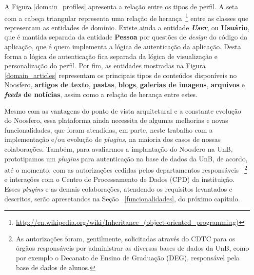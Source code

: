 A Figura \ref{domain_profiles} apresenta a relação entre os tipos de perfil.
A seta com a cabeça triangular representa uma relação de herança~\footnote{%
\url{http://en.wikipedia.org/wiki/Inheritance_(object-oriented_programming)}}
entre as classes que representam as entidades de domínio.
%
Existe ainda a entidade \textbf{\textit{User}}, ou \textbf{Usuário}, que é
mantida separada da entidade \textbf{Pessoa} por questões de \textit{design}
do código da aplicação, que é quem implementa a lógica de autenticação da
aplicação.
%
Desta forma a lógica de autenticação fica separada da lógica de
visualização e personalização do perfil.
%
Por fim, as entidades mostradas na Figura \ref{domain_articles} representam os
principais tipos de conteúdos disponíveis no Noosfero, \textbf{artigos
de texto}, \textbf{pastas}, \textbf{blogs}, \textbf{galerias de imagens},
\textbf{arquivos} e \textbf{\textit{feeds} de notícias}, assim como a
relação de herança entre estes.

Mesmo com as vantagens do ponto de vista arquitetural e a constante evolução do Noosfero,
essa plataforma ainda necessita de algumas melhorias e novas funcionalidades, que foram
atendidas, em parte, neste trabalho com a implementação e/ou evolução de \textit{plugins}, na
maioria dos casos de nossas colaborações.
%
Também, para avaliarmos a implantação do Noosfero na UnB, prototipamos um \textit{plugins} para autenticação
na base de dados da UnB, de acordo, até o momento, com as autorizações cedidas pelos departamentos responsáveis
~\footnote{As autorizações foram, gentilmente, solicitadas através do CDTC para os órgãos responsáveis por administrar
as diversas bases de dados da UnB, como por exemplo o Decanato de Ensino de Graduação (DEG), responsável pela
base de dados de alunos.} e interações com o Centro de Processamento de Dados (CPD) da instituição. Esses
\textit{plugins} e as demais colaborações, atendendo os requisitos levantados e descritos, serão apresetandos na Seção
~\ref{funcionalidades}, do próximo capítulo.
